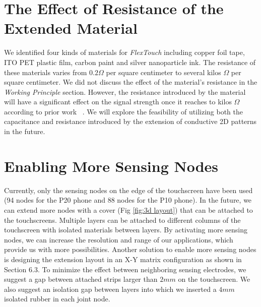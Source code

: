 \section{The Effect of Resistance of the Extended Material}
We identified four kinds of materials for \textit{FlexTouch} including copper foil tape, ITO PET plastic film, carbon paint and silver nanoparticle ink. The resistance of these materials varies from $0.2 \Omega$ per square centimeter to several kilos $\Omega$ per square centimeter. We did not discuss the effect of the material's resistance in the \textit{Working Principle} section. However, the resistance introduced by the material will have a significant effect on the signal strength once it reaches to kilos $\Omega$ according to prior work ~\cite{mobicom-gao18}. We will explore the feasibility of utilizing both the capacitance and resistance introduced by the extension of conductive 2D patterns in the future. 

\section{Enabling More Sensing Nodes}
Currently, only the sensing nodes on the edge of the touchscreen have been used (94 nodes for the P20 phone and 88 nodes for the P10 phone). In the future, we can extend more nodes with a cover (Fig \ref{fig:3d layout}) that can be attached to the touchscreens. Multiple layers can be attached to different columns of the touchscreen with isolated materials between layers. By activating more sensing nodes, we can increase the resolution and range of our applications, which provide us with more possibilities. Another solution to enable more sensing nodes is designing the extension layout in an X-Y matrix configuration as shown in Section $6.3$. To minimize the effect between neighboring sensing electrodes, we suggest a gap between attached strips larger than $2 mm$ on the touchscreen. We also suggest an isolation gap between layers into which we inserted a $4mm$ isolated rubber in each joint node. 


